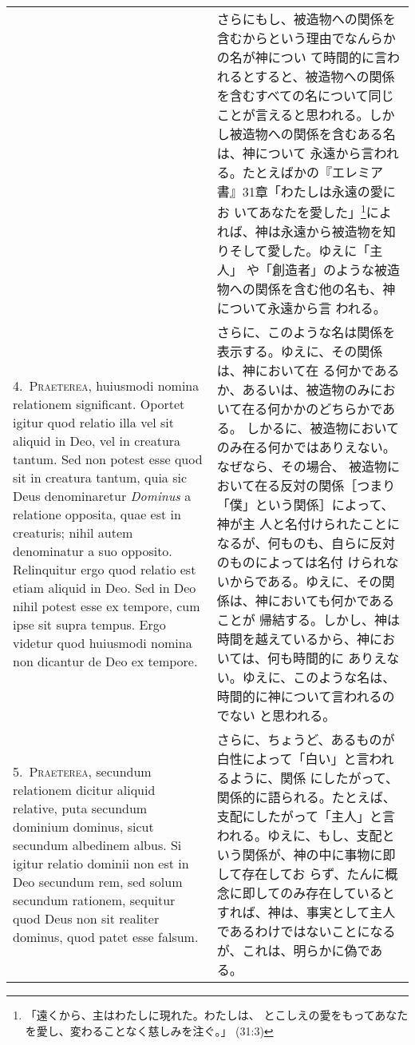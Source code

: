 \documentclass[10pt]{jsarticle}
\begin{document}
\begin{longtable}{p{21em}p{21em}}
&

さらにもし、被造物への関係を含むからという理由でなんらかの名が神につい
て時間的に言われるとすると、被造物への関係を含むすべての名について同じ
ことが言えると思われる。しかし被造物への関係を含むある名は、神について
永遠から言われる。たとえばかの『エレミア書』31章「わたしは永遠の愛にお
いてあなたを愛した」\footnote{「遠くから、主はわたしに現れた。わたしは、
とこしえの愛をもってあなたを愛し、変わることなく慈しみを注ぐ。」
(31:3)}によれば、神は永遠から被造物を知りそして愛した。ゆえに「主人」
や「創造者」のような被造物への関係を含む他の名も、神について永遠から言
われる。

\\

4.~{\scshape Praeterea}, huiusmodi nomina relationem
significant. Oportet igitur quod relatio illa vel sit aliquid in Deo,
vel in creatura tantum. Sed non potest esse quod sit in creatura
tantum, quia sic Deus denominaretur {\itshape Dominus} a relatione
opposita, quae est in creaturis; nihil autem denominatur a suo
opposito. Relinquitur ergo quod relatio est etiam aliquid in Deo. Sed
in Deo nihil potest esse ex tempore, cum ipse sit supra tempus. Ergo
videtur quod huiusmodi nomina non dicantur de Deo ex tempore.

&

さらに、このような名は関係を表示する。ゆえに、その関係は、神において在
る何かであるか、あるいは、被造物のみにおいて在る何かかのどちらかである。
しかるに、被造物においてのみ在る何かではありえない。なぜなら、その場合、
被造物において在る反対の関係［つまり「僕」という関係］によって、神が主
人と名付けられたことになるが、何ものも、自らに反対のものによっては名付
けられないからである。ゆえに、その関係は、神においても何かであることが
帰結する。しかし、神は時間を越えているから、神においては、何も時間的に
ありえない。ゆえに、このような名は、時間的に神について言われるのでない
と思われる。

\\

5.~{\scshape Praeterea}, secundum relationem dicitur aliquid relative,
puta secundum dominium dominus, sicut secundum albedinem albus. Si
igitur relatio dominii non est in Deo secundum rem, sed solum secundum
rationem, sequitur quod Deus non sit realiter dominus, quod patet esse
falsum.

&

さらに、ちょうど、あるものが白性によって「白い」と言われるように、関係
にしたがって、関係的に語られる。たとえば、支配にしたがって「主人」と言
われる。ゆえに、もし、支配という関係が、神の中に事物に即して存在してお
らず、たんに概念に即してのみ存在しているとすれば、神は、事実として主人
であるわけではないことになるが、これは、明らかに偽である。


\end{longtable}
\end{document}
